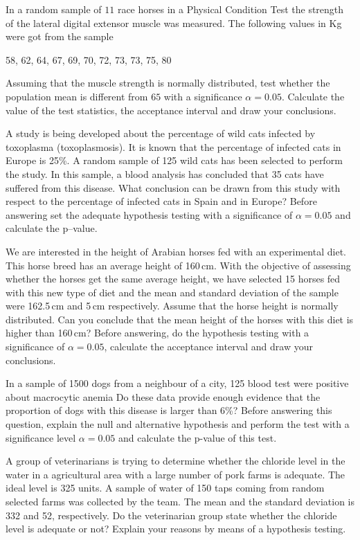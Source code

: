 \begin{problem}
  In a random sample of $11$ race horses in a Physical Condition  Test
  the strength of the lateral digital extensor muscle was measured. 
The following values in Kg were got from the sample  
\begin{center}
58, 62, 64, 67, 69, 70, 72, 73, 73, 75, 80 
\end{center}
Assuming that the muscle strength is normally distributed, test whether the population mean is different from $65$
with a significance $\alpha=0.05$. Calculate the value of the test
statistics, the acceptance interval and draw your conclusions.  
\end{problem}
\begin{problem}
  A study is being developed about the percentage of wild cats
  infected by toxoplasma (toxoplasmosis). It is known that the percentage of infected cats in Europe is 25\%. A random sample of 125 wild cats has been selected to perform the study. In this sample, a blood analysis has concluded that 35 cats have suffered from this disease.
What conclusion can be drawn from this study with respect to the
percentage of infected cats in Spain and in Europe?  Before answering set the adequate hypothesis testing with a significance of $\alpha=0.05$ and calculate the p--value. 
\end{problem}

\begin{problem}
  We are interested in the height of Arabian horses fed with an
  experimental diet. This horse breed has an average height of
  160\,cm. With the objective of assessing whether the horses get the
  same average height, we have selected 15 horses fed with this new
  type of diet and the mean and standard deviation of the sample were
  162.5\,cm and 5\,cm respectively. Assume that the horse height is
  normally distributed. Can you conclude that the mean height of the horses with this diet is higher than 160\,cm? Before answering, do the hypothesis testing with a significance of $\alpha=0.05$, calculate the acceptance interval and draw your conclusions. 
\end{problem}

\begin{problem}
  In a sample of 1500 dogs from a neighbour of a city, 125 blood test were positive about macrocytic anemia Do these data provide enough evidence that the proportion of dogs with this disease is larger than 6\%? Before answering this question, explain the null and alternative hypothesis and perform the test with a significance level $\alpha=0.05$ and calculate the p-value of this test. 
\end{problem}

\begin{problem}
  A group of veterinarians is trying to determine whether the chloride
  level in the water in a agricultural area with a large number of
  pork farms is adequate. The ideal level is 325 units. A sample of
  water of 150 taps coming from  random selected farms was collected
  by the team.
The mean and the standard deviation is 332 and 52,
respectively. Do the
veterinarian group state whether the chloride level is adequate or
not? 
Explain your reasons by means of a hypothesis testing. 
\end{problem}
